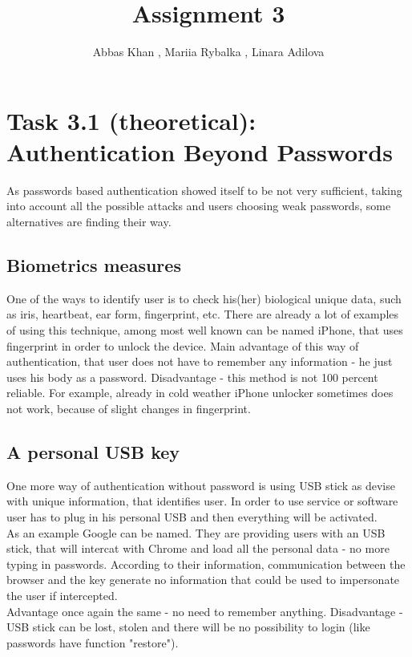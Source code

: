 \documentclass{article}
\title{Assignment 3}
\author{Abbas Khan , Mariia Rybalka , Linara Adilova}
\begin{document}
\maketitle 
    
\section*{Task 3.1 (theoretical): Authentication Beyond Passwords}
As passwords based authentication showed itself to be not very sufficient, taking into account all the possible attacks and users choosing weak passwords, some alternatives are finding their way.

\subsection*{ Biometrics measures }
One of the ways to identify user is to check his(her) biological unique data, such as iris, heartbeat, ear form, fingerprint, etc. There are already a lot of examples of using this technique, among most well known can be named iPhone, that uses fingerprint in order to unlock the device. Main advantage of this way of authentication, that user does not have to remember any information - he just uses his body as a password. Disadvantage - this method is not 100 percent reliable. For example, already in cold weather iPhone unlocker sometimes does not work, because of slight changes in fingerprint.

\subsection*{ A personal USB key }
One more way of authentication without password is using USB stick as devise with unique information, that identifies user. In order to use service or software user has to plug in his personal USB and then everything will be activated.
\\
\cite{altern} As an example Google can be named. They are providing users with an USB stick, that will intercat with Chrome and load all the personal data - no more typing in passwords. According to their information, communication between the browser and the key generate no information that could be used to impersonate the user if intercepted.
\\
Advantage once again the same - no need to remember anything. Disadvantage - USB stick can be lost, stolen and there will be no possibility to login (like passwords have function "restore").
\end{document}
